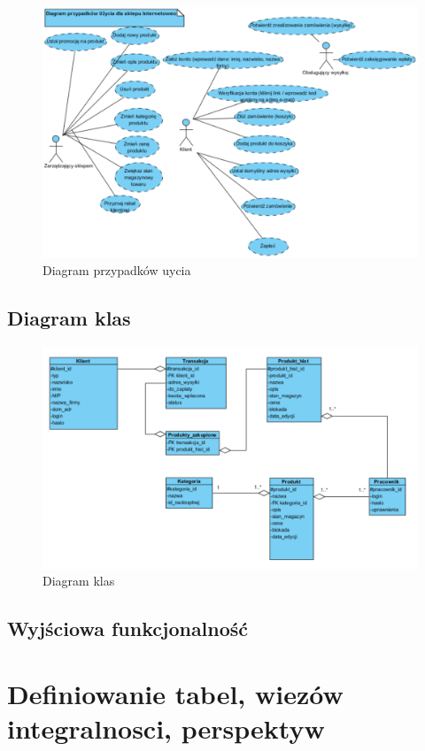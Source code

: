 \begin{figure}
	\centering
	\includegraphics[width=15 cm] {fig/use_case_diagram}
	\caption{Diagram przypadków uycia}
	\label{fig:use_case_diagram}
\end{figure}
\subsection{Diagram klas}
\begin{figure}
	\centering
	\includegraphics[width=15 cm] {fig/klasy}
	\caption{Diagram klas}
	\label{fig:diagram klas}
\end{figure}
\subsection{Wyjściowa funkcjonalność}
\section{Definiowanie tabel, wiezów integralnosci, perspektyw}